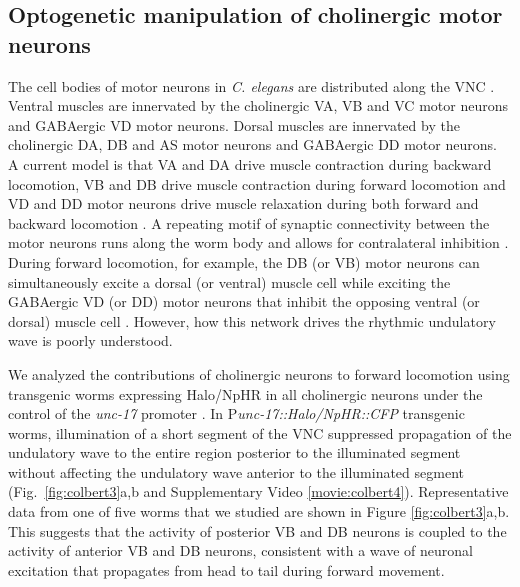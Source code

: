 \subsection{Optogenetic manipulation of cholinergic motor neurons}
The cell bodies of motor neurons in \textit{C. elegans} are distributed along the VNC \citep{von_stetina_motor_2006,wicks_dynamic_1996}. Ventral muscles are innervated by the cholinergic VA, VB and VC motor neurons and GABAergic VD motor neurons. Dorsal muscles are innervated by the cholinergic DA, DB and AS motor neurons and GABAergic DD motor neurons\citep{white_structure_1976,chen_wiring_2006}. A current model is that VA and DA drive muscle contraction during backward locomotion, VB and DB drive muscle contraction during forward locomotion and VD and DD motor neurons drive muscle relaxation during both forward and backward locomotion \citep{wicks_dynamic_1996,von_stetina_motor_2006,haspel_motoneurons_2010}. A repeating motif of synaptic connectivity between the motor neurons runs along the worm body and allows for contralateral inhibition \citep{von_stetina_motor_2006}. During forward locomotion, for example, the DB (or VB) motor neurons can simultaneously excite a dorsal (or ventral) muscle cell while exciting the GABAergic VD (or DD) motor neurons that inhibit the opposing ventral (or dorsal) muscle cell \citep{white_structure_1976,chen_wiring_2006}. However, how this network drives the rhythmic undulatory wave is poorly understood.

We analyzed the contributions of cholinergic neurons to forward locomotion using transgenic worms expressing Halo/NpHR in all cholinergic neurons under the control of the \textit{unc-17} promoter \citep{roghani_molecular_1994}. In P\textit{unc-17::Halo/NpHR::CFP} transgenic worms, illumination of a short segment of the VNC suppressed propagation of the undulatory wave to the entire region posterior to the illuminated segment without affecting the undulatory wave anterior to the illuminated segment (Fig.~\ref{fig:colbert3}a,b and Supplementary Video \ref{movie:colbert4}). Representative data from one of five worms that we studied are shown in Figure \ref{fig:colbert3}a,b. This suggests that the activity of posterior VB and DB neurons is coupled to the activity of anterior VB and DB neurons, consistent with a wave of neuronal excitation that propagates from head to tail during forward movement.

